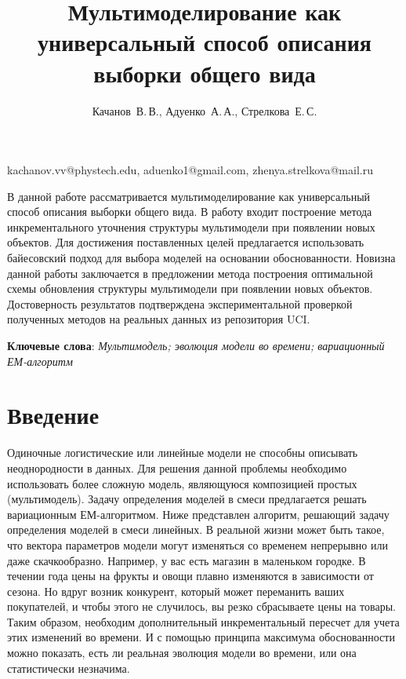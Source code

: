 \documentclass[12pt,twoside]{article}
\begin{document}
\title
    [Мультимоделирование как универсальный способ описания выборки общего вида] 
    {Мультимоделирование как универсальный способ описания выборки общего вида}
\author
    [Качанов~В.\,В., Адуенко~А.\,А., Стрелкова~Е.\,С.] %
    {Качанов~В.\,В., Адуенко~А.\,А., Стрелкова~Е.\,С.} %
\email
    {kachanov.vv@phystech.edu, aduenko1@gmail.com, zhenya.strelkova@mail.ru}
\abstract
    {В данной работе рассматривается мультимоделирование как универсальный способ описания выборки общего вида. В работу входит построение метода инкрементального уточнения структуры мультимодели при появлении новых объектов. Для достижения поставленных целей предлагается использовать байесовский подход для выбора моделей на основании обоснованности. Новизна данной работы заключается в предложении метода построения оптимальной схемы обновления структуры мультимодели при появлении новых объектов. Достоверность результатов подтверждена экспериментальной проверкой полученных методов на реальных данных из репозитория UCI.

\textbf{Ключевые слова}: \emph {Мультимодель; эволюция модели во времени; вариационный ЕМ-алгоритм }
}

\maketitle
\Russian
\section{Введение}
Одиночные логистические или линейные модели не способны описывать неоднородности в данных. Для решения данной проблемы необходимо использовать более сложную модель, являющуюся композицией простых (мультимодель). Задачу определения моделей в смеси предлагается решать вариационным ЕМ-алгоритмом\cite{aduenko}. Ниже представлен алгоритм, решающий задачу определения моделей в смеси линейных.
В реальной жизни может быть такое, что вектора параметров модели могут изменяться со временем непрерывно или даже скачкообразно.  Например, у вас есть магазин в маленьком городке. В течении года цены на фрукты и овощи плавно изменяются в зависимости от сезона. Но вдруг возник конкурент, который может переманить ваших покупателей, и чтобы этого не случилось, вы резко сбрасываете цены на товары. Таким образом, необходим дополнительный инкрементальный пересчет для учета этих изменений во времени. И с помощью принципа максимума обоснованности можно показать, есть ли реальная эволюция модели во времени, или она статистически незначима.
\end{document}
